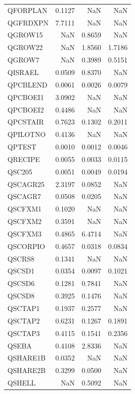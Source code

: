 \begin{longtable}{lrrr}
QFORPLAN &   0.1127 &       NaN &     NaN \\
QGFRDXPN &   7.7111 &       NaN &     NaN \\
QGROW15  &      NaN &    0.8659 &     NaN \\
QGROW22  &      NaN &    1.8560 &  1.7186 \\
QGROW7   &      NaN &    0.3989 &  0.5151 \\
QISRAEL  &   0.0509 &    0.8370 &     NaN \\
QPCBLEND &   0.0061 &    0.0026 &  0.0079 \\
QPCBOEI1 &   3.0902 &       NaN &     NaN \\
QPCBOEI2 &   0.4486 &       NaN &     NaN \\
QPCSTAIR &   0.7623 &    0.1302 &  0.2011 \\
QPILOTNO &   0.4136 &       NaN &     NaN \\
QPTEST   &   0.0010 &    0.0012 &  0.0046 \\
QRECIPE  &   0.0055 &    0.0033 &  0.0115 \\
QSC205   &   0.0051 &    0.0049 &  0.0194 \\
QSCAGR25 &   2.3197 &    0.0852 &     NaN \\
QSCAGR7  &   0.0508 &    0.0205 &     NaN \\
QSCFXM1  &   0.1020 &       NaN &     NaN \\
QSCFXM2  &   0.3591 &       NaN &     NaN \\
QSCFXM3  &   0.4865 &    6.4714 &     NaN \\
QSCORPIO &   0.4657 &    0.0318 &  0.0834 \\
QSCRS8   &   0.1341 &       NaN &     NaN \\
QSCSD1   &   0.0354 &    0.0097 &  0.1021 \\
QSCSD6   &   0.1281 &    0.7841 &     NaN \\
QSCSD8   &   0.3925 &    0.1476 &     NaN \\
QSCTAP1  &   0.1937 &    0.2577 &     NaN \\
QSCTAP2  &   0.6231 &    0.1267 &  0.1891 \\
QSCTAP3  &   0.4115 &    0.1541 &  0.2356 \\
QSEBA    &   0.4108 &    2.8336 &     NaN \\
QSHARE1B &   0.0352 &       NaN &     NaN \\
QSHARE2B &   0.3299 &    0.0500 &     NaN \\
QSHELL   &      NaN &    0.5092 &     NaN \\

\end{longtable}
